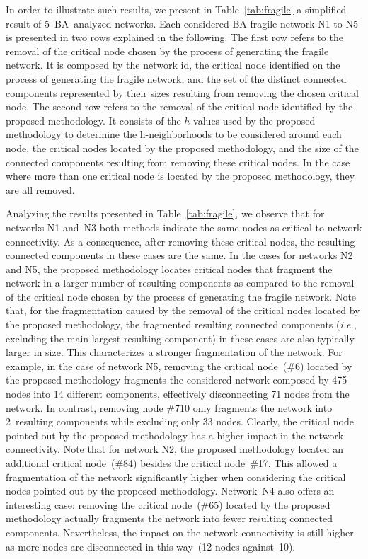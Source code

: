 \documentclass[conference,fleqn]{IEEEtran}
\begin{document}
In order to illustrate such results, we present 
in Table~\ref{tab:fragile} a simplified result of 5~BA~analyzed networks. Each considered BA fragile network N1 to N5 is presented in two rows explained
in the following. The first row 
refers to the removal of the critical node chosen by the process of generating the fragile network. It is composed by the network id,
the critical node identified on the process of generating the fragile network, and 
the set of the distinct connected components represented by their sizes resulting from removing the chosen critical node.
The second row refers to the removal of the critical node identified by the proposed methodology. It consists of the $h$ values used by the 
proposed methodology to determine the h-neighborhoods to be considered around each node, the critical nodes located by the proposed methodology,
and the size of the connected components resulting from removing these critical nodes. In the case where more than one critical
node is located by the proposed methodology, they are all removed.

Analyzing the results presented in Table~\ref{tab:fragile}, we observe that for networks N1 and~N3 both methods 
indicate the same nodes as critical to network connectivity. As a consequence, after removing these critical nodes,
the resulting connected components in these cases are the same. In the cases for networks N2 and N5, the proposed
methodology locates critical nodes that fragment the network in a larger number of resulting components as compared
to the removal of the critical node chosen by the process of generating the fragile network. Note that, for the fragmentation
caused by the removal of the critical nodes located by the proposed methodology, the fragmented
resulting connected components (\textit{i.e.}, excluding the main largest resulting component) in these cases are
also typically larger in size. This characterizes a stronger fragmentation of the network. For example, in the case
of network N5, removing the critical node~(\#6) located by the proposed methodology fragments the considered network 
composed by 475 nodes into 14 different components, effectively disconnecting 71 nodes from the network. In contrast,
removing node \#710 only fragments the network into 2~resulting components while excluding only 33 nodes.
Clearly, the critical node pointed out by the proposed methodology has a higher impact in the network connectivity.
Note that for network N2, the proposed methodology located an additional critical node~(\#84) besides the critical node~\#17.
This allowed a fragmentation of the network significantly higher when considering the critical nodes pointed out
by the proposed methodology.
Network~N4 also offers an interesting case: removing the critical node~(\#65) located by the proposed methodology actually
fragments the network into fewer resulting connected components. Nevertheless, the impact on the 
network connectivity is still higher as more nodes are disconnected in this way~(12 nodes against~10).
\end{document}
